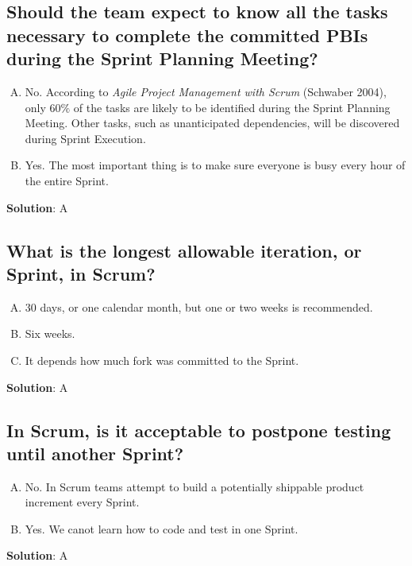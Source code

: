 \subsection{Should the team expect to know all the tasks necessary to complete the committed PBIs during the Sprint Planning Meeting?}
\begin{enumerate}[A)]
  \item No. According to \textit{Agile Project Management with Scrum} (Schwaber 2004), only 60$\%$ of
    the tasks are likely to be identified during the Sprint Planning Meeting. Other tasks,
    such as unanticipated dependencies, will be discovered during Sprint Execution.
  \item Yes. The most important thing is to make sure everyone is busy every hour of the entire
    Sprint.
\end{enumerate}


\textbf{Solution}: A


\subsection{What is the longest allowable iteration, or Sprint, in Scrum?}
\begin{enumerate}[A)]
  \item 30 days, or one calendar month, but one or two weeks is recommended.
  \item Six weeks.
  \item It depends how much fork was committed to the Sprint.
\end{enumerate}


\textbf{Solution}: A


\subsection{In Scrum, is it acceptable to postpone testing until another Sprint?}
\begin{enumerate}[A)]
  \item No. In Scrum teams attempt to build a potentially shippable product increment every Sprint.
  \item Yes. We canot learn how to code and test in one Sprint.
\end{enumerate}


\textbf{Solution}: A


